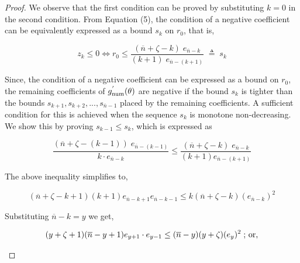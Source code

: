 \documentclass[letterpaper]{article} %
\theoremstyle{definition}
\begin{document}
\begin{proof}
\noindent We observe that the first condition can be proved by substituting $k = 0$ in the second condition. From Equation (5), the condition of a negative coefficient can be equivalently expressed as a bound $s_{k}$ on $r_{0}$, that is,\\
\begin{linenomath}
\begin{equation*}
z_{k} \leq 0 \iff r_{0} \leq \displaystyle \frac{(\overline{n} + \zeta - k) \; e_{\overline{n} - k}}{(k+1) \; e_{\overline{n}-(k+1)}} \; \triangleq \; s_{k}    
\end{equation*}
\end{linenomath}

\noindent Since, the condition of a negative coefficient can be expressed as a bound on $r_{0}$, the remaining coefficients of $g^{'}_{\textnormal{num}}(\theta)$ are negative if the bound $s_{k}$ is tighter than the bounds $s_{k+1}, s_{k+2}, ..., s_{\overline{n}-1}$ placed by the remaining coefficients. A sufficient condition for this is achieved when the sequence $s_{k}$ is monotone non-decreasing. We show this by proving $s_{k-1} \leq s_{k}$, which is expressed as\\
\begin{linenomath}
\begin{equation*}
\displaystyle \frac{(\overline{n} + \zeta -(k-1))\; e_{\overline{n} - (k-1)}}{k \cdot e_{\overline{n} - k}} \leq \displaystyle \frac{(\overline{n} + \zeta - k) \; e_{\overline{n} - k}}{(k+1) e_{\overline{n} - (k+1)}} 
\end{equation*}
\end{linenomath}

\noindent The above inequality simplifies to,
\begin{linenomath}
\begin{equation*}
(\overline{n} + \zeta - k + 1) (k+1) e_{\overline{n} - k + 1} e_{\overline{n} - k - 1} \leq k (\overline{n} + \zeta - k) (e_{\overline{n}-k})^{2}    
\end{equation*}
\end{linenomath}

\noindent Substituting $\overline{n} - k = y$ we get,
\begin{linenomath}
\begin{equation*}
\begin{split}
(y + \zeta + 1) (\overline{n}- y+1) e_{y+1} \cdot e_{y-1} \leq (\overline{n} - y) (y + \zeta) (e_{y})^{2} \; \textnormal{; or,}
\end{split}
\end{equation*}
\end{linenomath}


\end{proof}
\end{document}

